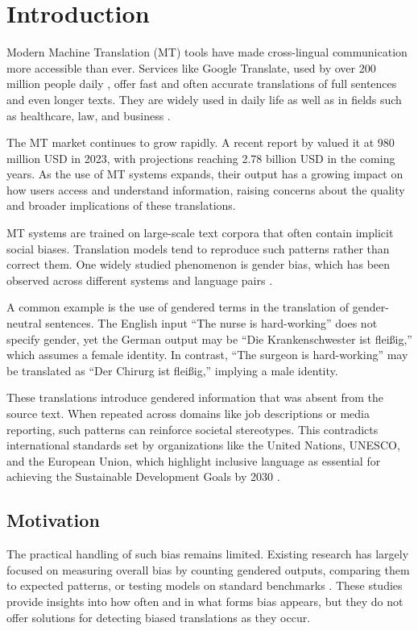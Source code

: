 \chapter{Introduction}
    Modern Machine Translation (MT) tools have made cross-lingual communication more accessible than ever. Services like Google Translate, used by over 200 million people daily \parencite{pratesAssessingGenderBias2019,shresthaExploringGenderBiases2022}, offer fast and often accurate translations of full sentences and even longer texts. They are widely used in daily life as well as in fields such as healthcare, law, and business \parencite{kapplAreAllSpanish2025}.

    The MT market continues to grow rapidly. A recent report by \textcite{skyquestMachineTranslationMT2025} valued it at 980 million USD in 2023, with projections reaching 2.78 billion USD in the coming years. As the use of MT systems expands, their output has a growing impact on how users access and understand information, raising concerns about the quality and broader implications of these translations.
    
    MT systems are trained on large-scale text corpora that often contain implicit social biases. Translation models tend to reproduce such patterns rather than correct them. One widely studied phenomenon is gender bias, which has been observed across different systems and language pairs \parencite{choMeasuringGenderBias2019,soundararajanInvestigatingGenderBias2024,smacchiaDoesAIReflect2024}. 

    A common example is the use of gendered terms in the translation of gender-neutral sentences. The English input “The nurse is hard-working” does not specify gender, yet the German output may be “Die Krankenschwester ist fleißig,” which assumes a female identity. In contrast, “The surgeon is hard-working” may be translated as “Der Chirurg ist fleißig,” implying a male identity. 
    
    These translations introduce gendered information that was absent from the source text. When repeated across domains like job descriptions or media reporting, such patterns can reinforce societal stereotypes. This contradicts international standards set by organizations like the United Nations, UNESCO, and the European Union, which highlight inclusive language as essential for achieving the Sustainable Development Goals by 2030 \parencite{sczesnyCanGenderFairLanguage2016,unitednationsAchieveGenderEquality2023}.

\section{Motivation}
    The practical handling of such bias remains limited. Existing research has largely focused on measuring overall bias by counting gendered outputs, comparing them to expected patterns, or testing models on standard benchmarks \parencite{rescignoGenderBiasMachine2023,barclayInvestigatingMarkersDrivers2024a,pratesAssessingGenderBias2019,savoldiWhatHarmQuantifying2024}. These studies provide insights into how often and in what forms bias appears, but they do not offer solutions for detecting biased translations as they occur.

